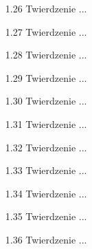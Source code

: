 \begin{enumerate}
    \item [1.26] Twierdzenie ... %
    \item [1.27] Twierdzenie ... %
    \item [1.28] Twierdzenie ... %
    \item [1.29] Twierdzenie ... %
    \item [1.30] Twierdzenie ... %
    \item [1.31] Twierdzenie ... %
    \item [1.32] Twierdzenie ... %
    \item [1.33] Twierdzenie ... %
    \item [1.34] Twierdzenie ... %
    \item [1.35] Twierdzenie ... %
    \item [1.36] Twierdzenie ... %

\end{enumerate}
